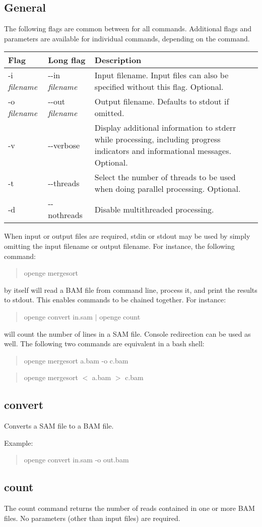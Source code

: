 \documentclass[11pt]{article}
\newcommand {\cmd}[1] {\begin{quote}#1\end{quote}}
\begin{document}
\subsection {General}
The following flags are common between for all commands. Additional flags and parameters are available for individual commands, depending on the command.
\begin{center}
\begin{tabular}{llp{3.5in}}
\hline
Flag&Long flag&Description\\ \hline
-i \textit{filename}&{-}{-}in \textit{filename}&Input filename. Input files can also be specified without this flag. Optional.\\
-o \textit{filename}&{-}{-}out \textit{filename}&Output filename. Defaults to stdout if omitted. \\
-v&{-}{-}verbose&Display additional information to stderr while processing, including progress indicators and informational messages. Optional.\\
-t&{-}{-}threads&Select the number of threads to be used when doing parallel processing. Optional.\\
-d&{-}{-}nothreads&Disable multithreaded processing.\\
\end{tabular}
\end{center}

When input or output files are required, stdin or stdout may be used by simply omitting the input filename or output filename. For instance, the following command:

\cmd{openge mergesort}

by itself will read a BAM file from command line, process it, and print the results to stdout. This enables commands to be chained together. For instance:

\cmd{openge convert in.sam $|$ openge count}

will count the number of lines in a SAM file. Console redirection can be used as well. The following two commands are equivalent in a bash shell:

\cmd{openge mergesort a.bam -o c.bam}
\cmd{openge mergesort $<$ a.bam $>$ c.bam}

\subsection {convert}
Converts a SAM file to a BAM file.

Example:
\cmd{openge convert in.sam -o out.bam}
\subsection {count}
The count command returns the number of reads contained in one or more BAM files. No parameters (other than input files) are required.
\end{document}
